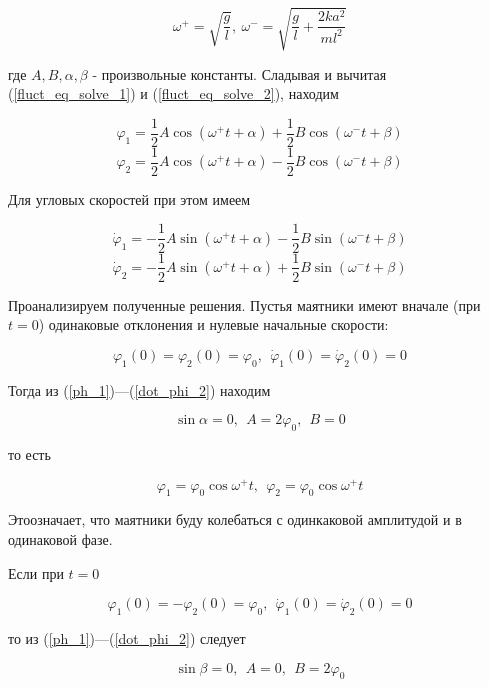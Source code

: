 \documentclass[14pt]{article}
\begin{document}
$$\omega^+ = \sqrt{\frac{g}{l}}, ~ \omega^- = \sqrt{\frac{g}{l} + \frac{2ka^2}{ml^2}}$$

\noindent где $A, B, \alpha, \beta$ - произвольные константы. Сладывая и вычитая (\ref{fluct_eq_solve_1}) и (\ref{fluct_eq_solve_2}), находим

\begin{equation}\label{ph_1}
\varphi_1 = \frac{1}{2}A\cos(\omega^+t + \alpha) + \frac{1}{2}B\cos(\omega^-t + \beta)
\end{equation}
\begin{equation}\label{ph_2}
\varphi_2 = \frac{1}{2}A\cos(\omega^+t + \alpha) - \frac{1}{2}B\cos(\omega^-t + \beta)
\end{equation}

\noindent Для угловых скоростей при этом имеем

\begin{equation}\label{dot_phi_1}
\dot \varphi_1 = -\frac{1}{2}A\sin(\omega^+t + \alpha) - \frac{1}{2}B\sin(\omega^-t + \beta)
\end{equation}
\begin{equation}\label{dot_phi_2}
\dot \varphi_2 = -\frac{1}{2}A\sin(\omega^+t + \alpha) + \frac{1}{2}B\sin(\omega^-t + \beta)
\end{equation}

Проанализируем полученные решения. Пустья маятники имеют вначале (при $t = 0$) одинаковые отклонения и нулевые начальные скорости:

$$\varphi_1(0) = \varphi_2(0) = \varphi_0, ~~\dot \varphi_1(0) = \dot \varphi_2(0) = 0$$

\noindent Тогда из (\ref{ph_1})---(\ref{dot_phi_2}) находим

$$\sin\alpha = 0, ~~A = 2\varphi_0, ~~B = 0$$

\noindent то есть

\begin{equation}\label{ph_1, ph_2, 1}
\varphi_1 = \varphi_0\cos\omega^+t, ~~\varphi_2 = \varphi_0\cos\omega^+t
\end{equation}

\noindent Этоозначает, что маятники буду колебаться с одинкаковой амплитудой и в одинаковой фазе.

Если при $t = 0$

$$\varphi_1(0) = -\varphi_2(0) = \varphi_0, ~~\dot \varphi_1(0) = \dot \varphi_2(0) = 0$$

\noindent то из (\ref{ph_1})---(\ref{dot_phi_2}) следует

$$\sin\beta = 0, ~~A = 0, ~~B = 2\varphi_0$$
\end{document}
